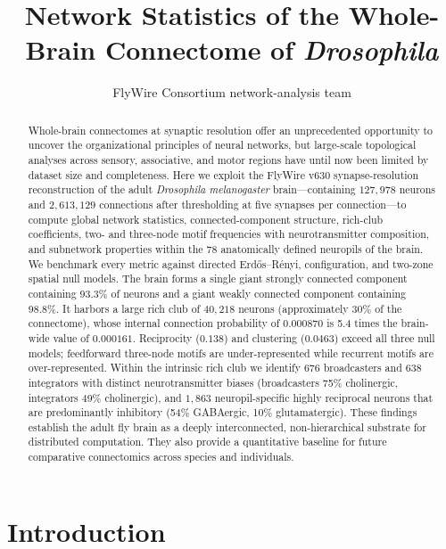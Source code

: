 \documentclass[11pt]{article}
\title{Network Statistics of the Whole-Brain Connectome of \textit{Drosophila}}
\author{FlyWire Consortium network-analysis team}
\date{}
\begin{document}
\maketitle

\begin{abstract}
Whole-brain connectomes at synaptic resolution offer an unprecedented
opportunity to uncover the organizational principles of neural networks, but
large-scale topological analyses across sensory, associative, and motor
regions have until now been limited by dataset size and completeness. Here
we exploit the FlyWire v630 synapse-resolution reconstruction of the adult
\textit{Drosophila melanogaster} brain---containing $127{,}978$ neurons and
$2{,}613{,}129$ connections after thresholding at five synapses per
connection---to compute global network statistics, connected-component
structure, rich-club coefficients, two- and three-node motif frequencies
with neurotransmitter composition, and subnetwork properties within the 78
anatomically defined neuropils of the brain. We benchmark every metric
against directed Erd{\H o}s--R{\'e}nyi, configuration, and two-zone spatial
null models. The brain forms a single giant strongly connected component
containing 93.3\% of neurons and a giant weakly connected component
containing 98.8\%. It harbors a large rich club of $40{,}218$ neurons
(approximately 30\% of the connectome), whose internal connection
probability of $0.000870$ is 5.4 times the brain-wide value of $0.000161$.
Reciprocity ($0.138$) and clustering ($0.0463$) exceed all three null models;
feedforward three-node motifs are under-represented while recurrent motifs
are over-represented. Within the intrinsic rich club we identify 676
broadcasters and 638 integrators with distinct neurotransmitter biases
(broadcasters 75\% cholinergic, integrators 49\% cholinergic), and $1{,}863$
neuropil-specific highly reciprocal neurons that are predominantly inhibitory
(54\% GABAergic, 10\% glutamatergic). These findings establish the adult fly brain as a deeply interconnected,
non-hierarchical substrate for distributed computation. They also provide
a quantitative baseline for future comparative connectomics across species
and individuals.
\end{abstract}

\section{Introduction}
\end{document}
